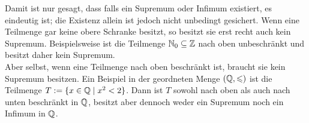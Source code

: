 \begin{bem}\label{verschiedeneSuprema}
	Damit ist nur gesagt, dass falls ein Supremum oder Infimum existiert, es eindeutig ist; die Existenz allein ist jedoch nicht unbedingt gesichert. Wenn eine Teilmenge gar keine obere Schranke besitzt, so besitzt sie erst recht auch kein Supremum. Beispielsweise ist die Teilmenge ${\mathbb N}_0 \subseteq {\mathbb Z}$ nach oben unbeschränkt und besitzt daher kein Supremum. \\[0.5em]
Aber selbst, wenn eine Teilmenge nach oben beschränkt ist, braucht sie kein Supremum besitzen. Ein Beispiel in der geordneten Menge $({\mathbb Q},\leqslant)$ ist die Teilmenge $T:=\{x\in {\mathbb Q} \mid x^2 < 2\}$. Dann ist $T$ sowohl nach oben als auch nach unten beschränkt in ${\mathbb Q}$, besitzt aber dennoch weder ein Supremum noch ein Infimum in ${\mathbb Q}$.
\end{bem}
